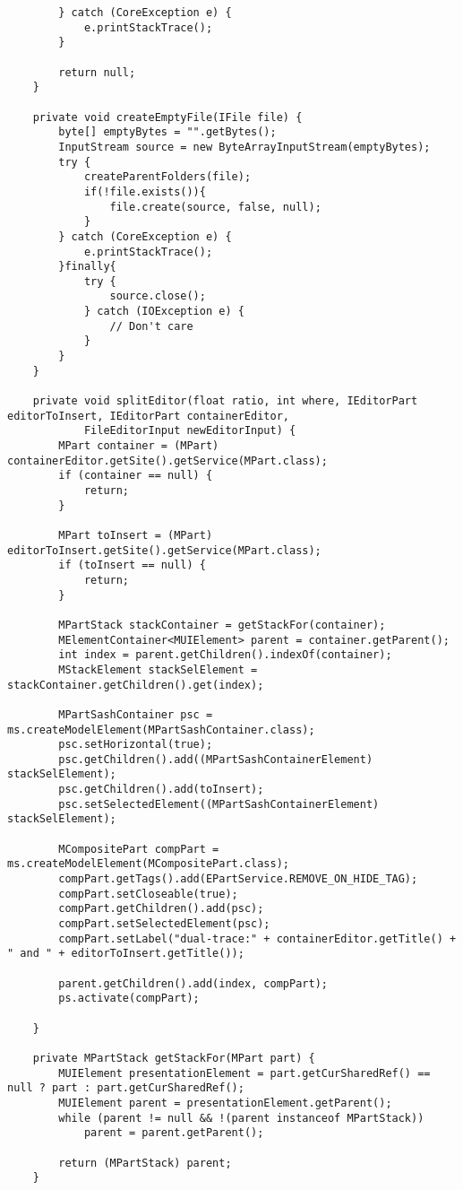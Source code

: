 \begin{lstlisting}
		} catch (CoreException e) {
			e.printStackTrace();
		}

		return null;
	}

    private void createEmptyFile(IFile file) {
		byte[] emptyBytes = "".getBytes();
		InputStream source = new ByteArrayInputStream(emptyBytes);
		try {
			createParentFolders(file);
			if(!file.exists()){
				file.create(source, false, null);
			}
		} catch (CoreException e) {
			e.printStackTrace();
		}finally{
			try {
				source.close();
			} catch (IOException e) {
				// Don't care
			}
		}
	}

	private void splitEditor(float ratio, int where, IEditorPart editorToInsert, IEditorPart containerEditor,
			FileEditorInput newEditorInput) {
		MPart container = (MPart) containerEditor.getSite().getService(MPart.class);
		if (container == null) {
			return;
		}

		MPart toInsert = (MPart) editorToInsert.getSite().getService(MPart.class);
		if (toInsert == null) {
			return;
		}

		MPartStack stackContainer = getStackFor(container);
		MElementContainer<MUIElement> parent = container.getParent();
		int index = parent.getChildren().indexOf(container);
		MStackElement stackSelElement = stackContainer.getChildren().get(index);

		MPartSashContainer psc = ms.createModelElement(MPartSashContainer.class);
		psc.setHorizontal(true);
		psc.getChildren().add((MPartSashContainerElement) stackSelElement);
		psc.getChildren().add(toInsert);
		psc.setSelectedElement((MPartSashContainerElement) stackSelElement);

		MCompositePart compPart = ms.createModelElement(MCompositePart.class);
		compPart.getTags().add(EPartService.REMOVE_ON_HIDE_TAG);
		compPart.setCloseable(true);
		compPart.getChildren().add(psc);
		compPart.setSelectedElement(psc);
		compPart.setLabel("dual-trace:" + containerEditor.getTitle() + " and " + editorToInsert.getTitle());

		parent.getChildren().add(index, compPart);
		ps.activate(compPart);

	}

	private MPartStack getStackFor(MPart part) {
		MUIElement presentationElement = part.getCurSharedRef() == null ? part : part.getCurSharedRef();
		MUIElement parent = presentationElement.getParent();
		while (parent != null && !(parent instanceof MPartStack))
			parent = parent.getParent();

		return (MPartStack) parent;
	}



\end{lstlisting}
